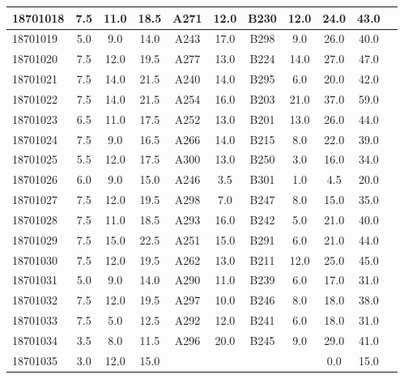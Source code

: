 \documentclass[12pt]{article}
\begin{document}
\begin{center}
\begin{small}
\begin{tabular}{|l|c|c|c|c|c|c|c|c|c|c|}
18701018 & 7.5 & 11.0 & 18.5 & A271 & 12.0 & B230 & 12.0 & 24.0 & 43.0\\ \hline 
18701019 & 5.0 & 9.0 & 14.0 & A243 & 17.0 & B298 & 9.0 & 26.0 & 40.0\\ \hline 
18701020 & 7.5 & 12.0 & 19.5 & A277 & 13.0 & B224 & 14.0 & 27.0 & 47.0\\ \hline 
18701021 & 7.5 & 14.0 & 21.5 & A240 & 14.0 & B295 & 6.0 & 20.0 & 42.0\\ \hline 
18701022 & 7.5 & 14.0 & 21.5 & A254 & 16.0 & B203 & 21.0 & 37.0 & 59.0\\ \hline 
18701023 & 6.5 & 11.0 & 17.5 & A252 & 13.0 & B201 & 13.0 & 26.0 & 44.0\\ \hline 
18701024 & 7.5 & 9.0 & 16.5 & A266 & 14.0 & B215 & 8.0 & 22.0 & 39.0\\ \hline 
18701025 & 5.5 & 12.0 & 17.5 & A300 & 13.0 & B250 & 3.0 & 16.0 & 34.0\\ \hline 
18701026 & 6.0 & 9.0 & 15.0 & A246 & 3.5 & B301 & 1.0 & 4.5 & 20.0\\ \hline 
18701027 & 7.5 & 12.0 & 19.5 & A298 & 7.0 & B247 & 8.0 & 15.0 & 35.0\\ \hline 
18701028 & 7.5 & 11.0 & 18.5 & A293 & 16.0 & B242 & 5.0 & 21.0 & 40.0\\ \hline 
18701029 & 7.5 & 15.0 & 22.5 & A251 & 15.0 & B291 & 6.0 & 21.0 & 44.0\\ \hline 
18701030 & 7.5 & 12.0 & 19.5 & A262 & 13.0 & B211 & 12.0 & 25.0 & 45.0\\ \hline 
18701031 & 5.0 & 9.0 & 14.0 & A290 & 11.0 & B239 & 6.0 & 17.0 & 31.0\\ \hline 
18701032 & 7.5 & 12.0 & 19.5 & A297 & 10.0 & B246 & 8.0 & 18.0 & 38.0\\ \hline 
18701033 & 7.5 & 5.0 & 12.5 & A292 & 12.0 & B241 & 6.0 & 18.0 & 31.0\\ \hline 
18701034 & 3.5 & 8.0 & 11.5 & A296 & 20.0 & B245 & 9.0 & 29.0 & 41.0\\ \hline 
18701035 & 3.0 & 12.0 & 15.0 &  &  &  &  & 0.0 & 15.0\\ \hline 
        \end{tabular}
            \end{small}
            \end{center}
  \centering
            
\end{document}
